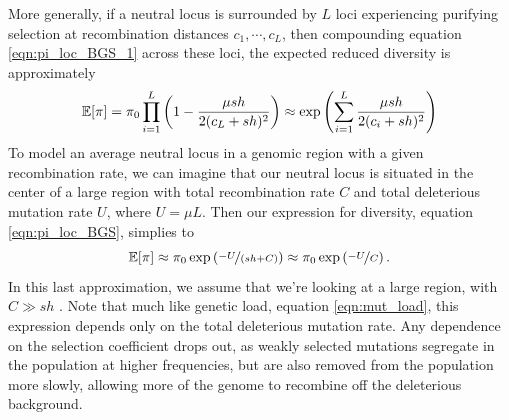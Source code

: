 More generally, if a neutral locus is surrounded by $L$ loci
experiencing purifying selection at recombination distances
$c_1,\cdots,c_L$, then compounding equation \eqref{eqn:pi_loc_BGS_1}
across these loci, the expected reduced diversity is approximately
\begin{equation}
\mathbb{E}[\pi] = \pi_0  \prod_{i=1}^L \left(1-\frac{\mu sh}{2(c_L+sh)^2}
\right) \approx \exp \left( \sum_{i=1}^L \frac{\mu sh}{2(c_i+sh)^2} \right) \label{eqn:pi_loc_BGS}
\end{equation}
To model an average neutral locus in a genomic region with a given recombination rate, we can imagine that our neutral locus is situated in the center of a large region with
total recombination rate $C$ and total deleterious mutation rate $U$,
where $U = \mu L$. Then our expression for diversity, equation \eqref{eqn:pi_loc_BGS}, simplies to 
\begin{equation}
\mathbb{E}[\pi] \approx \pi_0 \exp \left( \nicefrac{-U}{(sh+C)} \right)
\approx \pi_0 \exp \left( \nicefrac{-U}{C} \right). \label{eqn:GW_BGS_1}
\end{equation}
In this last approximation, we assume that we're looking at a
large region, with $C \gg sh$ . Note that much like genetic load,
equation \eqref{eqn:mut_load}, this expression depends only on the
total deleterious mutation rate. Any dependence on the selection
coefficient drops out, as weakly selected mutations segregate in the population at higher
frequencies, but are also removed from the population more slowly, allowing
more of the genome to recombine off the deleterious background. \\
